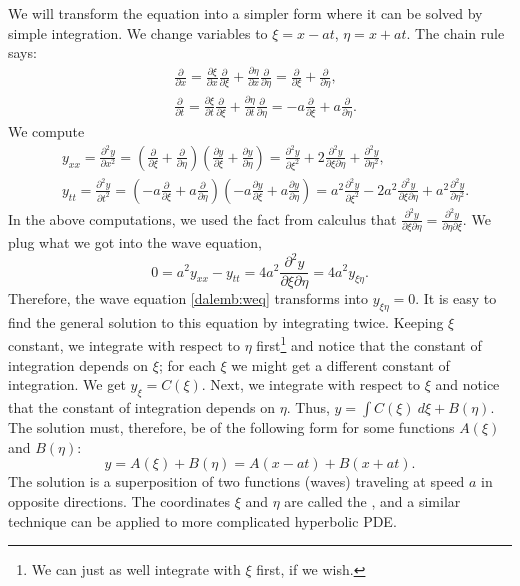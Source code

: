 We will transform the equation into a simpler form where it can be solved by
simple integration.
We change variables to $\xi = x - at$, $\eta = x + at$.
The chain rule says:
\begin{align*}
& \frac{\partial}{\partial x}
=
\frac{\partial \xi}{\partial x}
\frac{\partial}{\partial \xi}
+
\frac{\partial \eta}{\partial x}
\frac{\partial}{\partial \eta}
=
\frac{\partial}{\partial \xi}
+
\frac{\partial}{\partial \eta} , \\
& \frac{\partial}{\partial t}
=
\frac{\partial \xi}{\partial t}
\frac{\partial}{\partial \xi}
+
\frac{\partial \eta}{\partial t}
\frac{\partial}{\partial \eta}
=
-a
\frac{\partial}{\partial \xi}
+
a
\frac{\partial}{\partial \eta} .
\end{align*}
We compute
\begin{align*}
& y_{xx} = \frac{\partial^2 y}{\partial x^2}
=
\left(
\frac{\partial}{\partial \xi}
+
\frac{\partial}{\partial \eta}
\right)
\left(
\frac{\partial y}{\partial \xi}
+
\frac{\partial y}{\partial \eta}
\right)
=
\frac{\partial^2 y}{\partial \xi^2}
+
2 \frac{\partial^2 y}{\partial \xi \partial \eta}
+
\frac{\partial^2 y}{\partial \eta^2} ,
\\
& y_{tt} = \frac{\partial^2 y}{\partial t^2}
=
\left(
-a
\frac{\partial}{\partial \xi}
+ a
\frac{\partial}{\partial \eta}
\right)
\left(
-a
\frac{\partial y}{\partial \xi}
+
a
\frac{\partial y}{\partial \eta}
\right)
=
a^2
\frac{\partial^2 y}{\partial \xi^2}
-
2 a^2 \frac{\partial^2 y}{\partial \xi \partial \eta}
+
a^2
\frac{\partial^2 y}{\partial \eta^2} .
\end{align*}
In the above computations, we used the fact from calculus that
$\frac{\partial^2 y}{\partial \xi \partial \eta} = 
\frac{\partial^2 y}{\partial \eta \partial \xi}$.
We plug what we got into the wave equation,
\begin{equation*}
0 = a^2 y_{xx} - y_{tt} =
4 a^2 \frac{\partial^2 y}{\partial \xi \partial \eta} = 4 a^2 y_{\xi\eta} .
\end{equation*}
Therefore, the wave equation \eqref{dalemb:weq} transforms into
$y_{\xi\eta} = 0$.
It is easy to find the general solution to this equation by integrating
twice.  Keeping $\xi$ constant, we integrate with respect to $\eta$
first\footnote{We can just as well integrate with $\xi$ first, if we wish.}
and notice that
the constant of integration depends on $\xi$; for each $\xi$ we might get a
different constant of integration.  We get
$y_{\xi} = C(\xi)$.
Next, we integrate with respect to $\xi$ and notice that the constant of
integration depends on $\eta$.
Thus,
$y = \int C(\xi) ~ d\xi + B(\eta)$.
The solution must, therefore, be of the following form for some functions
$A(\xi)$ and $B(\eta)$:
\begin{equation*}
y = A(\xi) + B(\eta) = A(x-at) + B(x+at) .
\end{equation*}
The solution is a superposition of two functions (waves) traveling at speed
$a$
in opposite directions.  The coordinates $\xi$ and $\eta$ are called the
\emph{}, and a similar technique can
be applied to more complicated hyperbolic PDE.

